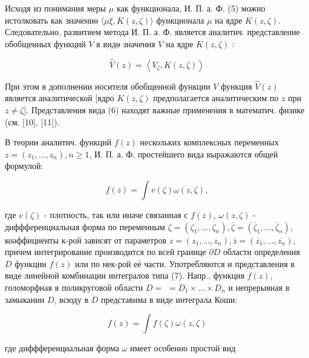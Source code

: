 \documentclass[10pt]{article}
\begin{document}
Исходя из понимания меры $\mu$ как функционала, И. П. а. Ф. (5) можно истолковать как значениө $\langle\mu \xi, K(z, \zeta)\rangle$ функционала $\mu$ на ядре $K(z, \zeta)$. Следовательно, развитием метода И. П. а. Ф. является аналитич. представление обобщенных функций $V$ в видө значения $V$ на ядре $K(z, \zeta)$ :



\[

\hat{V}(z)=\left\langle V_{\zeta}, K(z, \zeta)\right\rangle

\]



При этом в дополнении носителя обобщенной функции $V$ функция $\hat{V}(z)$ является аналитической [ядро $K(z, \zeta)$ предполагается аналитическим по $z$ при $z \neq \zeta]$. Представления вида (6) находят важные применения в математич. физике (см. [10], [11]).



В теории аналитич. функций $f(z)$ нескольких комплексных переменных $z=\left(z_{1}, \ldots, z_{n}\right), n \geqslant 1$, И. П. а. Ф. простейшего вида выражаются общей формулой:



\[

f(z)=\int v(\zeta) \omega(z, \zeta),

\]



где $v(\zeta)$ - плотность, так или иначе связанная с $f(z)$, $\omega(z, \zeta)$ - диффференциальная форма по переменным $\zeta=\left(\zeta_{1}, \ldots, \zeta_{n}\right), \bar{\zeta}=\left(\bar{\zeta}_{1}, \ldots, \bar{\zeta}_{n}\right), \quad$ коәффициенты к-рой зависят от параметров $z=\left(z_{1}, \ldots, z_{n}\right), \bar{z}=\left(\overline{z_{1}}, \ldots, \overline{z_{n}}\right)$, причем интегрирование производится по всей границе $\partial D$ области определения $D$ функции $f(z)$ или по нек-рой еѐ части. Употребляются и представления в виде линейной комбинации интегралов типа (7). Напр., функция $f(z)$, голоморфная в поликруговой области $D=$ $=D_{1} \times \ldots \times D_{n}$ и непрерывная в замыкании $D$, всюду в $D$ представима в виде интеграла Коши:



\[

f(z)=\int f(\zeta) \omega(z, \zeta)

\]



где диффференциальная форма $\omega$ имеет особенно простой вид
\end{document}
